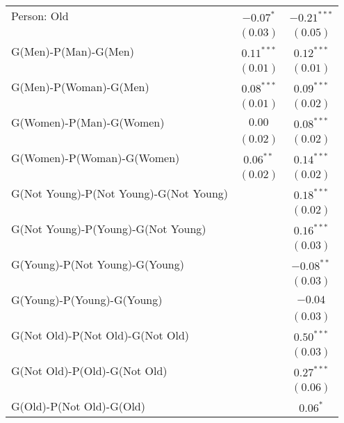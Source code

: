 \begin{center}
\begin{longtable}{l c c}
Person: Old                            & $-0.07^{*}$   & $-0.21^{***}$ \\
                                       & $(0.03)$      & $(0.05)$      \\
G(Men)-P(Man)-G(Men)                   & $0.11^{***}$  & $0.12^{***}$  \\
                                       & $(0.01)$      & $(0.01)$      \\
G(Men)-P(Woman)-G(Men)                 & $0.08^{***}$  & $0.09^{***}$  \\
                                       & $(0.01)$      & $(0.02)$      \\
G(Women)-P(Man)-G(Women)               & $0.00$        & $0.08^{***}$  \\
                                       & $(0.02)$      & $(0.02)$      \\
G(Women)-P(Woman)-G(Women)             & $0.06^{**}$   & $0.14^{***}$  \\
                                       & $(0.02)$      & $(0.02)$      \\
G(Not Young)-P(Not Young)-G(Not Young) &               & $0.18^{***}$  \\
                                       &               & $(0.02)$      \\
G(Not Young)-P(Young)-G(Not Young)     &               & $0.16^{***}$  \\
                                       &               & $(0.03)$      \\
G(Young)-P(Not Young)-G(Young)         &               & $-0.08^{**}$  \\
                                       &               & $(0.03)$      \\
G(Young)-P(Young)-G(Young)             &               & $-0.04$       \\
                                       &               & $(0.03)$      \\
G(Not Old)-P(Not Old)-G(Not Old)       &               & $0.50^{***}$  \\
                                       &               & $(0.03)$      \\
G(Not Old)-P(Old)-G(Not Old)           &               & $0.27^{***}$  \\
                                       &               & $(0.06)$      \\
G(Old)-P(Not Old)-G(Old)               &               & $0.06^{*}$    \\

\end{longtable}
\end{center}

